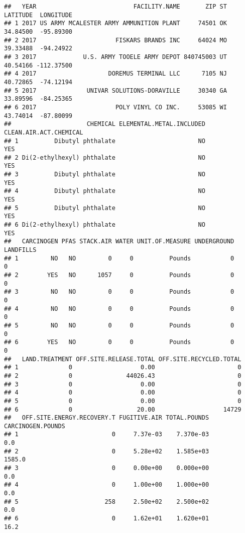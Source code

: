\documentclass[
]{article}
\begin{document}
\begin{verbatim}
##   YEAR                           FACILITY.NAME       ZIP ST LATITUDE  LONGITUDE
## 1 2017 US ARMY MCALESTER ARMY AMMUNITION PLANT     74501 OK 34.84500  -95.89300
## 2 2017                      FISKARS BRANDS INC     64024 MO 39.33488  -94.24922
## 3 2017             U.S. ARMY TOOELE ARMY DEPOT 840745003 UT 40.54166 -112.37500
## 4 2017                    DOREMUS TERMINAL LLC      7105 NJ 40.72865  -74.12194
## 5 2017              UNIVAR SOLUTIONS-DORAVILLE     30340 GA 33.89596  -84.25365
## 6 2017                      POLY VINYL CO INC.     53085 WI 43.74014  -87.80099
##                     CHEMICAL ELEMENTAL.METAL.INCLUDED CLEAN.AIR.ACT.CHEMICAL
## 1          Dibutyl phthalate                       NO                    YES
## 2 Di(2-ethylhexyl) phthalate                       NO                    YES
## 3          Dibutyl phthalate                       NO                    YES
## 4          Dibutyl phthalate                       NO                    YES
## 5          Dibutyl phthalate                       NO                    YES
## 6 Di(2-ethylhexyl) phthalate                       NO                    YES
##   CARCINOGEN PFAS STACK.AIR WATER UNIT.OF.MEASURE UNDERGROUND LANDFILLS
## 1         NO   NO         0     0          Pounds           0         0
## 2        YES   NO      1057     0          Pounds           0         0
## 3         NO   NO         0     0          Pounds           0         0
## 4         NO   NO         0     0          Pounds           0         0
## 5         NO   NO         0     0          Pounds           0         0
## 6        YES   NO         0     0          Pounds           0         0
##   LAND.TREATMENT OFF.SITE.RELEASE.TOTAL OFF.SITE.RECYCLED.TOTAL
## 1              0                   0.00                       0
## 2              0               44026.43                       0
## 3              0                   0.00                       0
## 4              0                   0.00                       0
## 5              0                   0.00                       0
## 6              0                  20.00                   14729
##   OFF.SITE.ENERGY.RECOVERY.T FUGITIVE.AIR TOTAL.POUNDS CARCINOGEN.POUNDS
## 1                          0     7.37e-03    7.370e-03               0.0
## 2                          0     5.28e+02    1.585e+03            1585.0
## 3                          0     0.00e+00    0.000e+00               0.0
## 4                          0     1.00e+00    1.000e+00               0.0
## 5                        258     2.50e+02    2.500e+02               0.0
## 6                          0     1.62e+01    1.620e+01              16.2
\end{verbatim}
\end{document}

